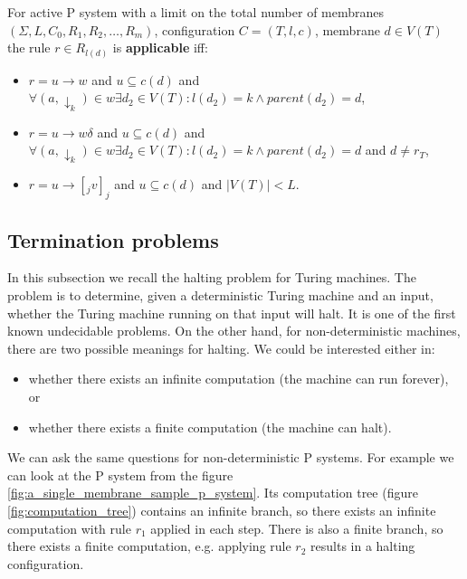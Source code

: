 \begin{definition}
  \label{def:applicable_rule_of_active_p_system_with_a_limit_on_total_number_of_membranes}
  For active P system with a limit on the total number of membranes $(\Sigma, L, C_0, R_1, R_2, \ldots, R_m)$, configuration $C = (T, l, c)$, membrane $d\in V(T)$ the rule $r\in R_{l(d)}$ is {\bf applicable} iff:
  \begin{itemize}
    \item $r = u\rightarrow w$ and $u\subseteq c(d)$ and $\forall (a,\downarrow_k)\in w \exists d_2\in V(T): l(d_2)=k \wedge parent(d_2) = d$,
    \item $r = u\rightarrow w\delta$ and $u\subseteq c(d)$ and $\forall (a,\downarrow_k)\in w \exists d_2\in V(T): l(d_2)=k \wedge parent(d_2) = d$ and $d\neq r_T$,
    \item $r = u\rightarrow [_j v]_j$ and $u\subseteq c(d)$ and $|V(T)|<L$.
  \end{itemize}
\end{definition}


\subsection{Termination problems} %
\label{sub:termination_problems}

In this subsection we recall the halting problem for Turing machines. The problem is to determine, given a deterministic Turing machine and an input, whether the Turing machine running on that input will halt. It is one of the first known undecidable problems. On the other hand, for non-deterministic machines, there are two possible meanings for halting. We could be interested either in:
\begin{itemize}
  \item whether there exists an infinite computation (the machine can run forever), or
  \item whether there exists a finite computation (the machine can halt).
\end{itemize}

We can ask the same questions for non-deterministic P systems.
For example we can look at the P system from the figure \ref{fig:a_single_membrane_sample_p_system}. Its computation tree (figure \ref{fig:computation_tree}) contains an infinite branch, so there exists an infinite computation with rule $r_1$ applied in each step. There is also a finite branch, so there exists a finite computation, e.g. applying rule $r_2$ results in a halting configuration.

